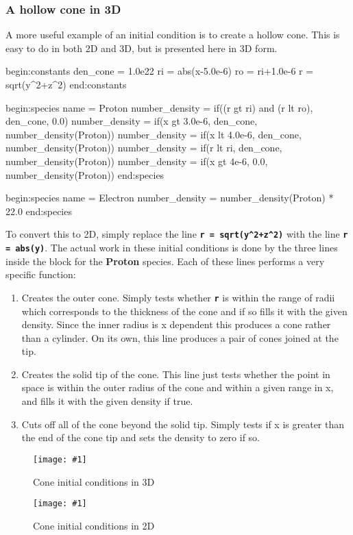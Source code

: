 \documentclass[12pt,a4paper]{article}
\newcommand{\inlinecode}[1]{{\color{warwickred} \bf\texttt{#1}}}
\newcommand{\inlineemph}[1]{{\color{warwicklight} \bf{#1}}}
\newcommand{\scaledcapimage}[4]
  {{\begin{figure}[hbt!]\centering\texttt{[image: \#1]}\caption{#3}
    \label{#2} \end{figure}}}
\newenvironment{lboxverbatim}[1]{
\setlength{\FrameSep}{0pt}
\def\FrameCommand{\fboxsep=0pt \colorbox{shadecolor}}
\MakeFramed{\FrameRestore}
\vspace{-13.5pt}
\fvset{label=#1}
\boxverb
}{
\endboxverb
\vspace{-13.5pt}
\endMakeFramed
}
\begin{document}
\subsubsection{A hollow cone in 3D}
A more useful example of an initial condition is to create a hollow cone. This
is easy to do in both 2D and 3D, but is presented here in 3D form.
\begin{lboxverbatim}{ic.deck}
begin:constants
   den_cone = 1.0e22
   ri = abs(x-5.0e-6)
   ro = ri+1.0e-6
   r = sqrt(y^2+z^2)
end:constants

begin:species
   name = Proton
   number_density = if((r gt ri) and (r lt ro), den_cone, 0.0)
   number_density = if(x gt 3.0e-6, den_cone, number_density(Proton))
   number_density = if(x lt 4.0e-6, den_cone, number_density(Proton))
   number_density = if(r lt ri, den_cone, number_density(Proton))
   number_density = if(x gt 4e-6, 0.0, number_density(Proton))
end:species

begin:species
   name = Electron
   number_density = number_density(Proton) * 22.0
end:species
\end{lboxverbatim}

To convert this to 2D, simply replace the line
\inlinecode{r = sqrt(y\^{}2+z\^{}2)} with the line \inlinecode{r = abs(y)}. The
actual work in these initial conditions is done by the three lines inside the
block for the \inlineemph{Proton} species. Each of these lines performs a very
specific function:

\begin{enumerate}
\item Creates the outer cone. Simply tests whether \inlinecode{r} is within
  the range of radii which corresponds to the thickness of the cone and if so
  fills it with the given density. Since the inner radius is x dependent this
  produces a cone rather than a cylinder. On its own, this line produces a
  pair of cones joined at the tip.
\item Creates the solid tip of the cone. This line just tests whether the
  point in space is within the outer radius of the cone and within a given
  range in x, and fills it with the given density if true.
\item Cuts off all of the cone beyond the solid tip. Simply tests if x is
  greater than the end of the cone tip and sets the density to zero if so.
\end{enumerate}

\scaledcapimage{./images/3dcone}{3dcone}{Cone initial conditions in 3D}{0.4}
\scaledcapimage{./images/2dcone}{2dcone}{Cone initial conditions in 2D}{0.4}
\end{document}
